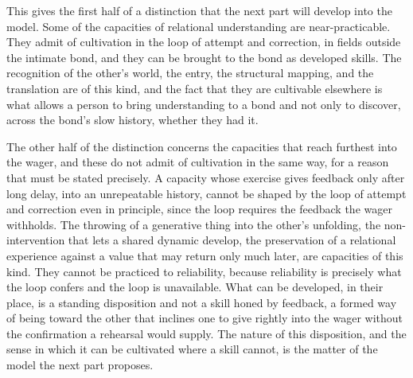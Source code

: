 This gives the first half of a distinction that the next part will develop into the model. Some of the capacities of relational understanding are near-practicable. They admit of cultivation in the loop of attempt and correction, in fields outside the intimate bond, and they can be brought to the bond as developed skills. The recognition of the other's world, the entry, the structural mapping, and the translation are of this kind, and the fact that they are cultivable elsewhere is what allows a person to bring understanding to a bond and not only to discover, across the bond's slow history, whether they had it.

The other half of the distinction concerns the capacities that reach furthest into the wager, and these do not admit of cultivation in the same way, for a reason that must be stated precisely. A capacity whose exercise gives feedback only after long delay, into an unrepeatable history, cannot be shaped by the loop of attempt and correction even in principle, since the loop requires the feedback the wager withholds. The throwing of a generative thing into the other's unfolding, the non-intervention that lets a shared dynamic develop, the preservation of a relational experience against a value that may return only much later, are capacities of this kind. They cannot be practiced to reliability, because reliability is precisely what the loop confers and the loop is unavailable. What can be developed, in their place, is a standing disposition and not a skill honed by feedback, a formed way of being toward the other that inclines one to give rightly into the wager without the confirmation a rehearsal would supply. The nature of this disposition, and the sense in which it can be cultivated where a skill cannot, is the matter of the model the next part proposes.
